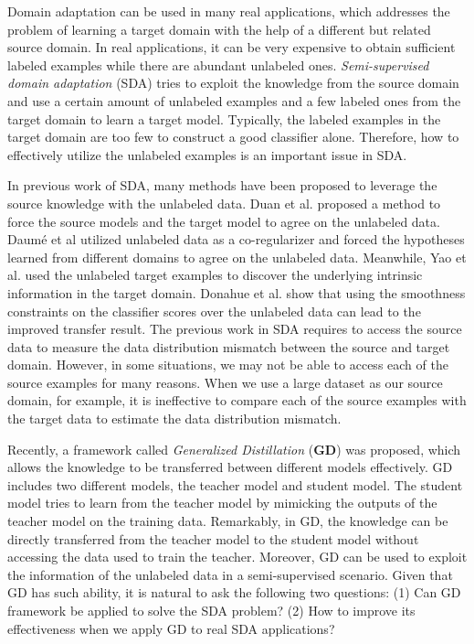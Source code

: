 Domain adaptation can be used in many real applications, which addresses the problem of learning a target domain with the help of a different but related source domain. 
In real applications, it can be very expensive to obtain sufficient labeled examples while there are abundant unlabeled ones. 
\textit{Semi-supervised domain adaptation} (SDA) tries to exploit the knowledge from the source domain and use a certain amount of unlabeled examples and a few labeled ones from the target domain to learn a target model. Typically, the labeled examples in the target domain are too few to construct a good classifier alone. Therefore, how to effectively utilize the unlabeled examples is an important issue in SDA. 

In previous work of SDA, many methods have been proposed to leverage the source knowledge with the unlabeled data.
Duan et al.\cite{duan2009domain} proposed a method to force the source models and the target model to agree on the unlabeled data. Daum{\'e} et al\cite{daume2010frustratingly} utilized unlabeled data as a co-regularizer and forced the hypotheses learned from different domains to agree on the unlabeled data. Meanwhile, Yao et al.\cite{yao2015semi} used the unlabeled target examples to discover the underlying intrinsic information in the target domain. Donahue et al.\cite{Donahue_2013_CVPR} show that using the smoothness constraints on the classifier scores over the unlabeled data can lead to the improved transfer result.
The previous work in SDA requires to access the source data to measure the data distribution mismatch between the source and target domain.
However, in some situations, we may not be able to access each of the source examples for many reasons. When we use a large dataset as our source domain, for example, it is ineffective to compare each of the source examples with the target data to estimate the data distribution mismatch.

Recently, a framework called \textit{Generalized Distillation} (\textbf{GD})\cite{lopez2015unifying} was proposed, which allows the knowledge to be transferred between different models effectively. GD includes two different models, the teacher model and student model. The student model tries to learn from the teacher model by mimicking the outputs of the teacher model on the training data. Remarkably, in GD, the knowledge can be directly transferred from the teacher model to the student model without accessing the data used to train the teacher. Moreover, GD can be used to exploit the information of the unlabeled data in a semi-supervised scenario\cite{lopez2015unifying}.
Given that GD has such ability, it is natural to ask the following two questions: (1) Can GD framework be applied to solve the SDA problem? (2) How to improve its effectiveness when we apply GD to real SDA applications?

